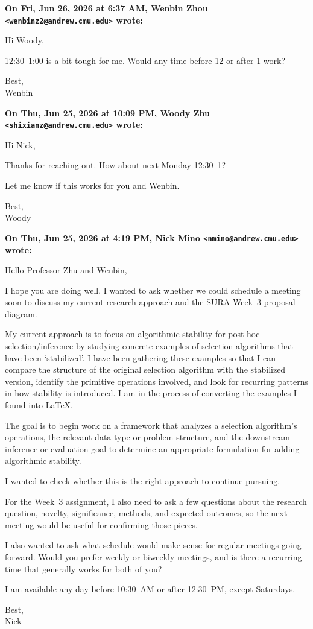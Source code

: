 \documentclass[11pt]{article}
\newcommand{\Email}[3]{%
  \medskip\noindent\textbf{On #1, #2 wrote:}\par\nobreak
  \begingroup\RaggedRight #3\par\endgroup
}
\begin{document}
\Email{Fri, Jun 26, 2026 at 6:37 AM}{Wenbin Zhou
\texttt{<wenbinz2@andrew.cmu.edu>}}{%
Hi Woody,

12:30--1:00 is a bit tough for me. Would any time before 12 or after 1 work?

Best,\\
Wenbin}

\Email{Thu, Jun 25, 2026 at 10:09 PM}{Woody Zhu
\texttt{<shixianz@andrew.cmu.edu>}}{%
Hi Nick,

Thanks for reaching out. How about next Monday 12:30--1?

Let me know if this works for you and Wenbin.

Best,\\
Woody}

\Email{Thu, Jun 25, 2026 at 4:19 PM}{Nick Mino
\texttt{<nmino@andrew.cmu.edu>}}{%
Hello Professor Zhu and Wenbin,

I hope you are doing well. I wanted to ask whether we could schedule a meeting
soon to discuss my current research approach and the SURA Week~3 proposal
diagram.

My current approach is to focus on algorithmic stability for post hoc
selection/inference by studying concrete examples of selection algorithms that
have been `stabilized'. I have been gathering these examples so that I can
compare the structure of the original selection algorithm with the stabilized
version, identify the primitive operations involved, and look for recurring
patterns in how stability is introduced. I am in the process of converting the
examples I found into LaTeX.

The goal is to begin work on a framework that analyzes a selection algorithm's
operations, the relevant data type or problem structure, and the downstream
inference or evaluation goal to determine an appropriate formulation for adding
algorithmic stability.

I wanted to check whether this is the right approach to continue pursuing.

For the Week~3 assignment, I also need to ask a few questions about the
research question, novelty, significance, methods, and expected outcomes, so
the next meeting would be useful for confirming those pieces.

I also wanted to ask what schedule would make sense for regular meetings going
forward. Would you prefer weekly or biweekly meetings, and is there a recurring
time that generally works for both of you?

I am available any day before 10:30~AM or after 12:30~PM, except Saturdays.

Best,\\
Nick}
\end{document}
